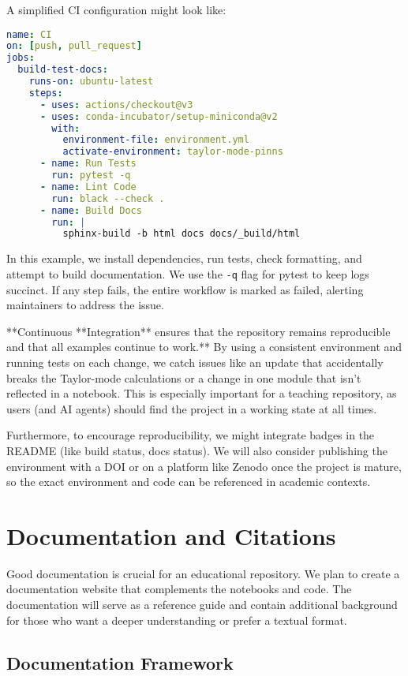 \documentclass[11pt]{article}
\begin{document}
A simplified CI configuration might look like:

\begin{lstlisting}[language=Yaml, caption=.github/workflows/ci.yml (simplified)]
name: CI
on: [push, pull_request]
jobs:
  build-test-docs:
    runs-on: ubuntu-latest
    steps:
      - uses: actions/checkout@v3
      - uses: conda-incubator/setup-miniconda@v2
        with:
          environment-file: environment.yml
          activate-environment: taylor-mode-pinns
      - name: Run Tests
        run: pytest -q
      - name: Lint Code
        run: black --check .
      - name: Build Docs
        run: |
          sphinx-build -b html docs docs/_build/html
\end{lstlisting}

In this example, we install dependencies, run tests, check formatting, and attempt to build documentation. We use the \texttt{-q} flag for pytest to keep logs succinct. If any step fails, the entire workflow is marked as failed, alerting maintainers to address the issue.

**Continuous **Integration** ensures that the repository remains reproducible and that all examples continue to work.** By using a consistent environment and running tests on each change, we catch issues like an update that accidentally breaks the Taylor-mode calculations or a change in one module that isn't reflected in a notebook. This is especially important for a teaching repository, as users (and AI agents) should find the project in a working state at all times.

Furthermore, to encourage reproducibility, we might integrate badges in the README (like build status, docs status). We will also consider publishing the environment with a DOI or on a platform like Zenodo once the project is mature, so the exact environment and code can be referenced in academic contexts.

\section{Documentation and Citations}
\label{sec:docs}

Good documentation is crucial for an educational repository. We plan to create a documentation website that complements the notebooks and code. The documentation will serve as a reference guide and contain additional background for those who want a deeper understanding or prefer a textual format.

\subsection{Documentation Framework}
\end{document}
